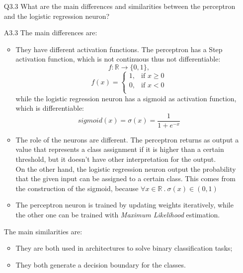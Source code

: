 \documentclass[11pt]{scrartcl}
\begin{document}
\begin{itemize}
\item[Q3.3] What are the main differences and similarities between the perceptron and the logistic regression neuron?
\item[A3.3] The main differences are:
\begin{itemize}
    \item They have different activation functions. The perceptron has a Step activation function, which is not continuous thus not differentiable:
    $$f: \mathbb{R} \longrightarrow \{0,1\},$$
    $$f(x) = 
        \begin{cases}
          1, & \text{if $x \ge 0$}\\
          0, & \text{if $x < 0 $}\\
        \end{cases}
    $$
    while the logistic regression neuron has a sigmoid as activation function, which is differentiable:
    $$sigmoid(x) = \sigma(x) = \frac{1}{1 + e^{-x}}$$
    \item The role of the neurons are different. The perceptron returns as output a value that represents a class assignment if it is higher than a certain threshold, but it doesn't have other interpretation for the output. \\
    On the other hand, the logistic regression neuron output the probability that the given input can be assigned to a certain class. This comes from the construction of the sigmoid, because $\forall x \in \mathbb{R}\ .\ \sigma(x) \in (0, 1)$
    \item The perceptron neuron is trained by updating weights iteratively, while the other one can be trained with \textit{Maximum Likelihood} estimation.
\end{itemize}

The main similarities are:
\begin{itemize}
    \item They are both used in architectures to solve binary classification tasks;
    \item They both generate a decision boundary for the classes.
\end{itemize} 

\end{itemize}
\end{document}
